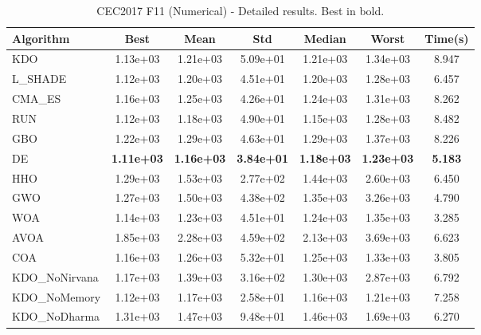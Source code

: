 \begin{table}[H]
\centering\small
\caption{CEC2017 F11 (Numerical) - Detailed results. Best in bold.}
\label{tab:cec2017_F11}
\begin{tabular}{lcccccc}
\toprule
\textbf{Algorithm} & \textbf{Best} & \textbf{Mean} & \textbf{Std} & \textbf{Median} & \textbf{Worst} & \textbf{Time(s)} \\
\midrule
KDO & 1.13e+03 & 1.21e+03 & 5.09e+01 & 1.21e+03 & 1.34e+03 & 8.947 \\
L_SHADE & 1.12e+03 & 1.20e+03 & 4.51e+01 & 1.20e+03 & 1.28e+03 & 6.457 \\
CMA_ES & 1.16e+03 & 1.25e+03 & 4.26e+01 & 1.24e+03 & 1.31e+03 & 8.262 \\
RUN & 1.12e+03 & 1.18e+03 & 4.90e+01 & 1.15e+03 & 1.28e+03 & 8.482 \\
GBO & 1.22e+03 & 1.29e+03 & 4.63e+01 & 1.29e+03 & 1.37e+03 & 8.226 \\
DE & \textbf{1.11e+03} & \textbf{1.16e+03} & \textbf{3.84e+01} & \textbf{1.18e+03} & \textbf{1.23e+03} & \textbf{5.183} \\
HHO & 1.29e+03 & 1.53e+03 & 2.77e+02 & 1.44e+03 & 2.60e+03 & 6.450 \\
GWO & 1.27e+03 & 1.50e+03 & 4.38e+02 & 1.35e+03 & 3.26e+03 & 4.790 \\
WOA & 1.14e+03 & 1.23e+03 & 4.51e+01 & 1.24e+03 & 1.35e+03 & 3.285 \\
AVOA & 1.85e+03 & 2.28e+03 & 4.59e+02 & 2.13e+03 & 3.69e+03 & 6.623 \\
COA & 1.16e+03 & 1.26e+03 & 5.32e+01 & 1.25e+03 & 1.33e+03 & 3.805 \\
KDO_NoNirvana & 1.17e+03 & 1.39e+03 & 3.16e+02 & 1.30e+03 & 2.87e+03 & 6.792 \\
KDO_NoMemory & 1.12e+03 & 1.17e+03 & 2.58e+01 & 1.16e+03 & 1.21e+03 & 7.258 \\
KDO_NoDharma & 1.31e+03 & 1.47e+03 & 9.48e+01 & 1.46e+03 & 1.69e+03 & 6.270 \\
\bottomrule
\end{tabular}
\end{table}
